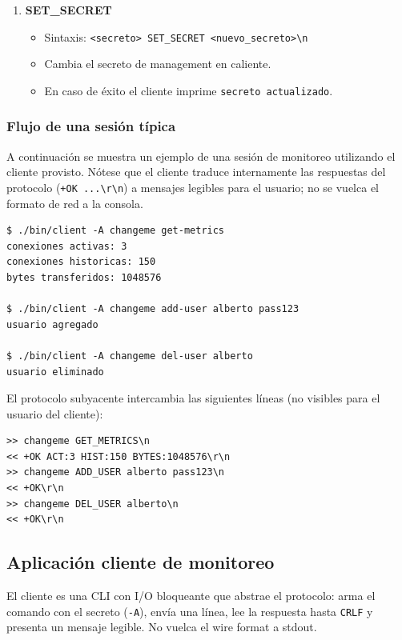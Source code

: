 \documentclass[12pt,a4paper]{article}
\begin{document}
\begin{enumerate}
    \item \textbf{SET\_SECRET}
    \begin{itemize}
        \item Sintaxis: \verb|<secreto> SET_SECRET <nuevo_secreto>\n|
        \item Cambia el secreto de management en caliente.
        \item En caso de éxito el cliente imprime \texttt{secreto actualizado}.
    \end{itemize}
\end{enumerate}

\subsubsection{Flujo de una sesión típica}

A continuación se muestra un ejemplo de una sesión de monitoreo utilizando el
cliente provisto. Nótese que el cliente traduce internamente las respuestas del
protocolo (\texttt{+OK ...\textbackslash r\textbackslash n}) a mensajes legibles
para el usuario; no se vuelca el formato de red a la consola.

\begin{lstlisting}[caption=Ejemplo de sesión de monitoreo con el cliente]
$ ./bin/client -A changeme get-metrics
conexiones activas: 3
conexiones historicas: 150
bytes transferidos: 1048576

$ ./bin/client -A changeme add-user alberto pass123
usuario agregado

$ ./bin/client -A changeme del-user alberto
usuario eliminado
\end{lstlisting}

El protocolo subyacente intercambia las siguientes líneas (no visibles para el
usuario del cliente):

\begin{lstlisting}[caption=Formato de red subyacente (wire format)]
>> changeme GET_METRICS\n
<< +OK ACT:3 HIST:150 BYTES:1048576\r\n
>> changeme ADD_USER alberto pass123\n
<< +OK\r\n
>> changeme DEL_USER alberto\n
<< +OK\r\n
\end{lstlisting}

\subsection{Aplicación cliente de monitoreo}

El cliente es una CLI con I/O bloqueante que abstrae el protocolo: arma el comando
con el secreto (\texttt{-A}), envía una línea, lee la respuesta hasta \texttt{CRLF}
y presenta un mensaje legible. No vuelca el wire format a stdout.
\end{document}
